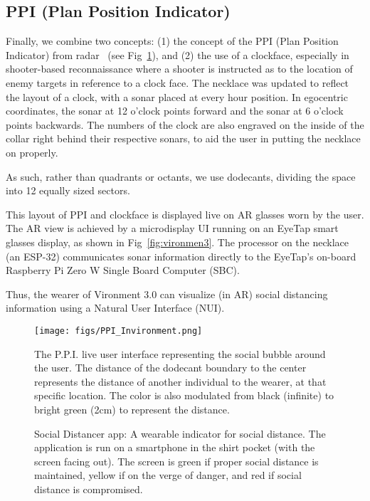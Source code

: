 \documentclass[journal]{journal}
\begin{document}
\subsection{PPI (Plan Position Indicator)}
Finally, we combine two concepts:
(1) the concept of the PPI (Plan Position Indicator) from
radar~\cite{harold1946plan} (see Fig~\ref{fig:ppi}),
and (2) the use of a clockface, especially in shooter-based reconnaissance
where a shooter is instructed as to the location of enemy targets in reference to a clock face. The necklace was updated to reflect the layout of a clock, with a sonar placed at every hour position. In egocentric coordinates, the sonar at 12 o'clock points forward and the sonar at 6 o'clock points backwards. The numbers of the clock are also engraved on the inside of the collar right behind their respective sonars, to aid the user in putting the necklace on properly. 

As such, rather than quadrants or octants, we use dodecants, dividing the space into 12 equally sized sectors.

This layout of PPI and clockface is displayed live on AR glasses worn by the user. The AR view is achieved by a microdisplay UI running on an EyeTap \cite{mann2002eyetap} smart glasses display, as shown in Fig~\ref{fig:vironmen3}.  The processor on the necklace (an ESP-32) communicates sonar information directly to the EyeTap's on-board Raspberry Pi Zero W Single Board Computer (SBC). 

Thus, the wearer of Vironment 3.0 can visualize (in AR) social distancing information using a Natural User Interface (NUI).

\begin{figure}
    \centering
    \texttt{[image: figs/PPI\_Invironment.png]}
    \caption{The P.P.I. live user interface representing the social bubble around the user. The distance of the dodecant boundary to the center represents the distance of another individual to the wearer, at that specific location. The color is also modulated from black (infinite) to bright green (2cm) to represent the distance.}
    \label{fig:ppi}
\end{figure}


\begin{figure*} %
\centering
{}
\hfil
{}
\hfil
{}
\caption{Social Distancer app: A wearable indicator for social distance. The application is run on a smartphone in the shirt pocket (with the screen facing out). The screen is green if proper social distance is maintained, yellow if on the verge of danger, and red if social distance is compromised.}
\label{fig:mobilesocialdistancer}
\end{figure*}
\end{document}
